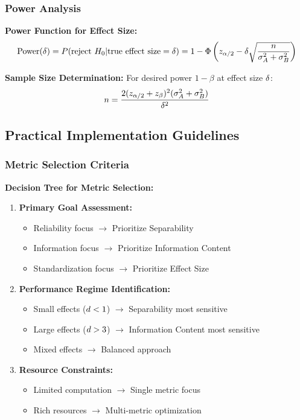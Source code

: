 \subsubsection{Power Analysis}

\textbf{Power Function for Effect Size:}
\begin{equation}
\text{Power}(\delta) = P(\text{reject } H_0 | \text{true effect size} = \delta) = 1 - \Phi\left(z_{\alpha/2} - \delta\sqrt{\frac{n}{\sigma_A^2 + \sigma_B^2}}\right)
\end{equation}

\textbf{Sample Size Determination:}
For desired power $1 - \beta$ at effect size $\delta$:
\begin{equation}
n = \frac{2(z_{\alpha/2} + z_\beta)^2(\sigma_A^2 + \sigma_B^2)}{\delta^2}
\end{equation}

\subsection{Practical Implementation Guidelines}

\subsubsection{Metric Selection Criteria}

\textbf{Decision Tree for Metric Selection:}
\begin{enumerate}
\item \textbf{Primary Goal Assessment:}
   \begin{itemize}
   \item Reliability focus $\to$ Prioritize Separability
   \item Information focus $\to$ Prioritize Information Content
   \item Standardization focus $\to$ Prioritize Effect Size
   \end{itemize}

\item \textbf{Performance Regime Identification:}
   \begin{itemize}
   \item Small effects ($d < 1$) $\to$ Separability most sensitive
   \item Large effects ($d > 3$) $\to$ Information Content most sensitive
   \item Mixed effects $\to$ Balanced approach
   \end{itemize}

\item \textbf{Resource Constraints:}
   \begin{itemize}
   \item Limited computation $\to$ Single metric focus
   \item Rich resources $\to$ Multi-metric optimization
   \end{itemize}
\end{enumerate}

